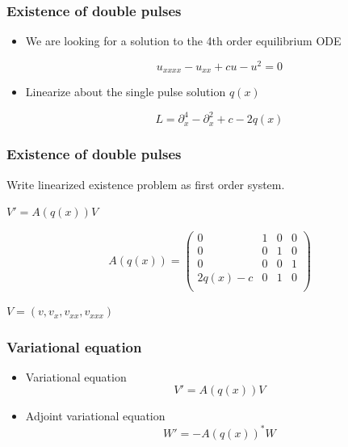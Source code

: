 \documentclass[16pt]{beamer}
\begin{document}
\begin{frame}
	\frametitle{Existence of double pulses}
	\fontsize{16}{7.2}\selectfont

	\begin{itemize}
	\item We are looking for a solution to the 4th order equilibrium ODE
	\begin{center}
	\[u_{xxxx} - u_{xx} + cu - u^2 = 0\]
	\end{center}		
	\vspace{0.5cm}

	\item Linearize about the single pulse solution $q(x)$
	\begin{center}
	\[ L = \partial_x^4 - \partial_x^2 + c - 2 q(x) \]
	\end{center}

	\end{itemize}

\end{frame}


\begin{frame}
	\frametitle{Existence of double pulses}
	\fontsize{16}{7.2}\selectfont

	Write linearized existence problem as first order system.

	\begin{center}
		$V' = A(q(x))V$
	\end{center}

	\begin{center}
	\[
		A(q(x)) = 
		\begin{pmatrix}
		0 & 1 & 0 & 0\\
		0 & 0 & 1 & 0\\
		0 & 0 & 0 & 1\\
		2q(x) - c & 0 & 1 & 0 \\ 
		\end{pmatrix}
	\]
	\end{center}
	\begin{center}
		$V = (v,v_x, v_{xx}, v_{xxx} )$
	\end{center}
\end{frame}

\begin{frame}
	\frametitle{Variational equation}
	\fontsize{16}{7.2}\selectfont

	\begin{itemize}
		\item Variational equation\\
		\[V' = A(q(x)) V\]
		\item Adjoint variational equation \\
		\[W' = -A(q(x))^* W\]
	\end{itemize}
\end{frame}
\end{document}
